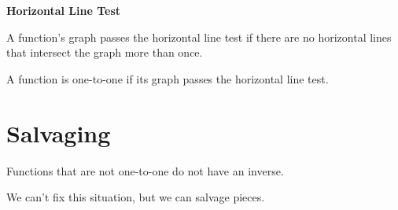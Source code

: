 \documentclass{ximera}
\begin{document}
\begin{example}
\begin{image}
\end{image}






\end{example}




\begin{definition} \textbf{\textcolor{green!50!black}{Horizontal Line Test}}  


A function's graph passes the horizontal line test if there are no horizontal lines that intersect the graph more than once.


A function is one-to-one if its graph passes the horizontal line test.

\end{definition}
















\section*{Salvaging}


Functions that are not one-to-one do not have an inverse.

We can't fix this situation, but we can salvage pieces. \\
\end{document}
